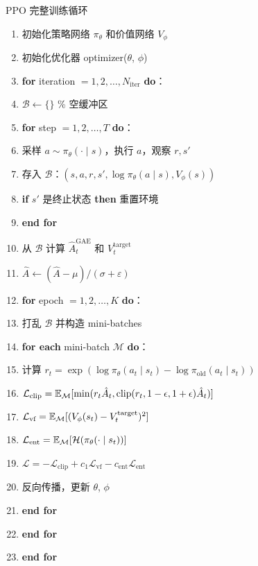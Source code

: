 \begin{myalgorithm}{PPO 完整训练循环}
\begin{enumerate}
    \item 初始化策略网络 $\pi_\theta$ 和价值网络 $V_\phi$
    \item 初始化优化器 optimizer($\theta$, $\phi$)
    \item \textbf{for} iteration $= 1, 2, \dots, N_{\text{iter}}$ \textbf{do}：
    \item \quad $\mathcal{B} \leftarrow \{\}$ \qquad \% 空缓冲区
    \item \quad \textbf{for} step $= 1, 2, \dots, T$ \textbf{do}：
    \item \quad \quad 采样 $a \sim \pi_\theta(\cdot \mid s)$，执行 $a$，观察 $r, s'$
    \item \quad \quad 存入 $\mathcal{B}$：$(s, a, r, s', \log\pi_\theta(a\mid s), V_\phi(s))$
    \item \quad \quad \textbf{if} $s'$ 是终止状态 \textbf{then} 重置环境
    \item \quad \textbf{end for}
    \item \quad 从 $\mathcal{B}$ 计算 $\hat{A}_t^{\text{GAE}}$ 和 $V_t^{\text{target}}$
    \item \quad $\hat{A} \leftarrow (\hat{A} - \mu) / (\sigma + \varepsilon)$
    \item \quad \textbf{for} epoch $= 1, 2, \dots, K$ \textbf{do}：
    \item \quad \quad 打乱 $\mathcal{B}$ 并构造 mini-batches
    \item \quad \quad \textbf{for each} mini-batch $\mathcal{M}$ \textbf{do}：
    \item \quad \quad \quad 计算 $r_t = \exp(\log\pi_\theta(a_t\mid s_t) - \log\pi_{\text{old}}(a_t\mid s_t))$
    \item \quad \quad \quad $\mathcal{L}_{\text{clip}} = \mathbb{E}_{\mathcal{M}}[ \min(r_t \hat{A}_t, \operatorname{clip}(r_t, 1-\epsilon, 1+\epsilon)\hat{A}_t) ]$
    \item \quad \quad \quad $\mathcal{L}_{\text{vf}} = \mathbb{E}_{\mathcal{M}}[ (V_\phi(s_t) - V_t^{\text{target}})^2 ]$
    \item \quad \quad \quad $\mathcal{L}_{\text{ent}} = \mathbb{E}_{\mathcal{M}}[ \mathcal{H}(\pi_\theta(\cdot\mid s_t)) ]$
    \item \quad \quad \quad $\mathcal{L} = -\mathcal{L}_{\text{clip}} + c_1 \mathcal{L}_{\text{vf}} - c_{\text{ent}} \mathcal{L}_{\text{ent}}$
    \item \quad \quad \quad 反向传播，更新 $\theta$, $\phi$
    \item \quad \quad \textbf{end for}
    \item \quad \textbf{end for}
    \item \textbf{end for}
\end{enumerate}
\end{myalgorithm}

